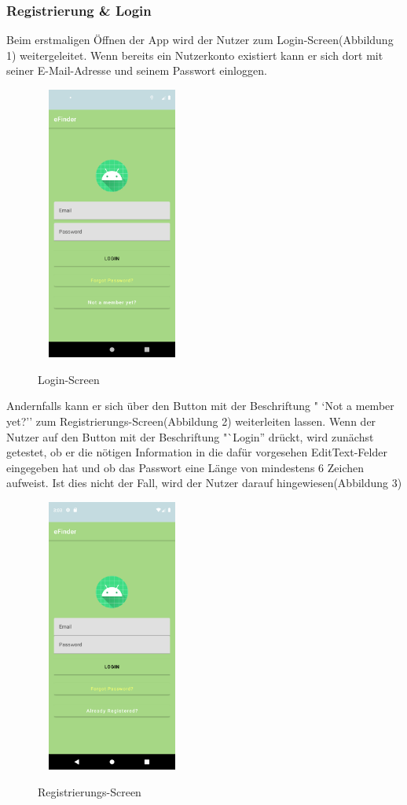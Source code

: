 \documentclass[12pt, a4paper, oneside]{article}
\begin{document}
\subsubsection{Registrierung \& Login}
Beim erstmaligen Öffnen der App wird der Nutzer zum Login-Screen(Abbildung 1) weitergeleitet. Wenn bereits ein Nutzerkonto existiert kann er sich dort mit seiner E-Mail-Adresse und seinem Passwort einloggen.\\
\newpage
\begin{figure}
\includegraphics[width=5cm, height=9cm]{Login-Screen.png}
\centering
\label{login}
\caption{Login-Screen}
\end{figure}
Andernfalls kann er sich über den Button mit der Beschriftung " `Not a member yet?'' zum Registrierungs-Screen(Abbildung 2) weiterleiten lassen. Wenn der Nutzer auf den Button mit der Beschriftung "`Login'' drückt, wird zunächst getestet, ob er die nötigen Information in die dafür vorgesehen EditText-Felder eingegeben hat und ob das Passwort eine Länge von mindestens 6 Zeichen aufweist. Ist dies nicht der Fall, wird der Nutzer darauf hingewiesen(Abbildung 3)
\begin{figure}
\includegraphics[width=5cm, height=9cm]{Registrierungs-Screen.png}
\centering
\label{register}
\caption{Registrierungs-Screen}
\end{figure}
\end{document}
